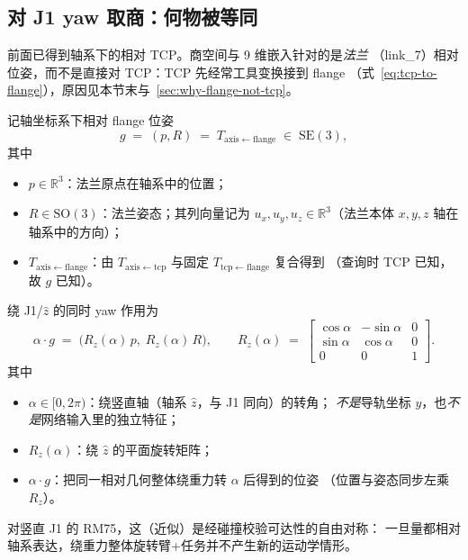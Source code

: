 \documentclass[UTF8,a4paper,11pt,fontset=fandol]{ctexart}
\newcommand{\SE}{\mathrm{SE}}
\newcommand{\SO}{\mathrm{SO}}
\newcommand{\R}{\mathbb{R}}
\begin{document}
\subsection{对 J1 yaw 取商：何物被等同}
\label{sec:quotient}

前面已得到轴系下的相对 TCP。商空间与 9 维嵌入针对的是\emph{法兰}
（link\_7）相对位姿，而不是直接对 TCP：TCP 先经常工具变换接到 flange
（式~\eqref{eq:tcp-to-flange}），原因见本节末与~\ref{sec:why-flange-not-tcp}。

记轴坐标系下相对 flange 位姿
\begin{equation}
\label{eq:g-def}
  g
  \;=\;
  (p,R)
  \;=\;
  T_{\mathrm{axis\leftarrow flange}}
  \;\in\;
  \SE(3),
\end{equation}
其中
\begin{itemize}[leftmargin=1.4em]
  \item \(p\in\R^{3}\)：法兰原点在轴系中的位置；
  \item \(R\in\SO(3)\)：法兰姿态；其列向量记为
        \(u_{x},u_{y},u_{z}\in\R^{3}\)（法兰本体 \(x,y,z\) 轴在轴系中的方向）；
  \item \(T_{\mathrm{axis\leftarrow flange}}\)：由
        \(T_{\mathrm{axis\leftarrow tcp}}\) 与固定
        \(T_{\mathrm{tcp\leftarrow flange}}\) 复合得到
        （查询时 TCP 已知，故 \(g\) 已知）。
\end{itemize}

绕 J1/\(\hat z\) 的同时 yaw 作用为
\begin{equation}
\label{eq:yaw-action}
  \alpha\cdot g
  \;=\;
  \bigl(R_{z}(\alpha)\,p,\; R_{z}(\alpha)\,R\bigr),
  \qquad
  R_{z}(\alpha)
  \;=\;
  \begin{bmatrix}
    \cos\alpha & -\sin\alpha & 0 \\
    \sin\alpha & \cos\alpha & 0 \\
    0 & 0 & 1
  \end{bmatrix}.
\end{equation}
其中
\begin{itemize}[leftmargin=1.4em]
  \item \(\alpha\in[0,2\pi)\)：绕竖直轴（轴系 \(\hat z\)，与 J1 同向）的转角；
        \emph{不是}导轨坐标 \(y\)，也\emph{不是}网络输入里的独立特征；
  \item \(R_{z}(\alpha)\)：绕 \(\hat z\) 的平面旋转矩阵；
  \item \(\alpha\cdot g\)：把同一相对几何整体绕重力转 \(\alpha\) 后得到的位姿
        （位置与姿态同步左乘 \(R_{z}\)）。
\end{itemize}
对竖直 J1 的 RM75，这（近似）是经碰撞校验可达性的自由对称：
一旦量都相对轴系表达，绕重力整体旋转臂+任务并不产生新的运动学情形。
\end{document}
